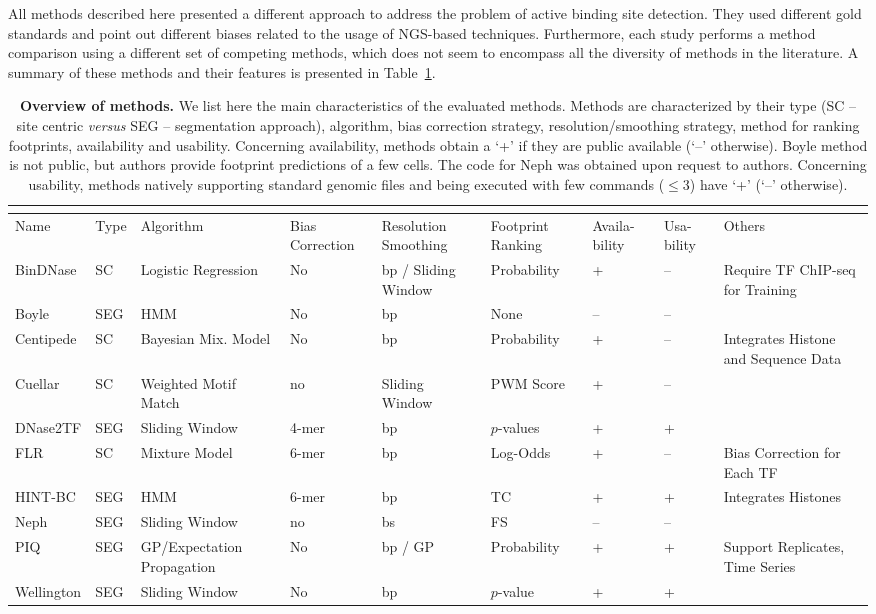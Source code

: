 All methods described here presented a different approach to address the problem of active binding site detection. They used different gold standards and point out different biases related to the usage of NGS-based techniques. Furthermore, each study performs a method comparison using a different set of competing methods, which does not seem to encompass all the diversity of methods in the literature. A summary of these methods and their features is presented in Table~\ref{tab:overview_methods}.

\begin{footnotesize}
\begin{longtable}{p{1.4cm}p{0.6cm}p{1.7cm}p{1.3cm}p{1.6cm}p{1.6cm}p{0.8cm}p{0.8cm}p{2cm}}
\caption[Overview of methods]{\textbf{Overview of methods.} We list here the main characteristics of the evaluated methods. Methods are characterized by their type (SC -- site centric \emph{versus} SEG -- segmentation approach), algorithm, bias correction strategy, resolution/smoothing strategy, method for ranking footprints, availability and usability. Concerning availability, methods obtain a `+' if they are public available (`--' otherwise). Boyle method is not public, but authors provide footprint predictions of a few cells. The code for Neph was obtained upon request to authors. Concerning usability, methods natively supporting standard genomic files and being executed with few commands ($\leq3$) have `+' (`--' otherwise).} \\
\label{tab:overview_methods} \\
  \hline
    Name & Type & Algorithm & Bias Correction & Resolution Smoothing & Footprint Ranking & Availa- bility & Usa- bility & Others\\
  \hline
    BinDNase & SC & Logistic Regression & No & bp / Sliding Window & Probability & + & -- & Require TF ChIP-seq for Training\\
    Boyle & SEG & HMM & No & bp & None & -- & -- & \\
    Centipede & SC & Bayesian Mix. Model & No & bp & Probability & + & -- & Integrates Histone and Sequence Data\\
    Cuellar & SC & Weighted Motif Match & no & Sliding Window & PWM Score & + & -- & \\
    DNase2TF & SEG & Sliding Window & 4-mer & bp & $p$-values & + & + & \\
    FLR & SC & Mixture Model & 6-mer & bp & Log-Odds & + & -- & Bias Correction for Each TF\\
    HINT-BC & SEG & HMM & 6-mer & bp & TC & + & + & Integrates Histones\\
    Neph & SEG & Sliding Window & no & bs & FS & -- & -- & \\
    PIQ & SEG & GP/Expectation Propagation & No & bp / GP & Probability & + & + & Support Replicates, Time Series\\
    Wellington & SEG & Sliding Window & No & bp & $p$-value & + & + & \\
  \hline
\end{longtable}
\end{footnotesize}

